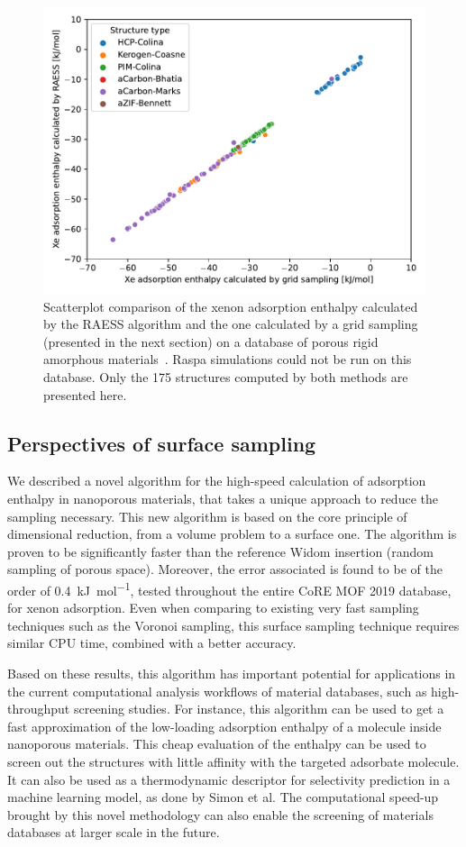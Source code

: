 \documentclass[main]{subfiles}
\begin{document}
\begin{figure}[ht]
  \centering
  \includegraphics[width=0.5\linewidth]{figures/3-fastsim/amorphous_enthalpy.pdf}
  \caption{Scatterplot comparison of the xenon adsorption enthalpy calculated by the RAESS algorithm and the one calculated by a grid sampling (presented in the next section) on a database of porous rigid amorphous materials~\cite{Thyagarajan_2020}. Raspa simulations could not be run on this database. Only the 175 structures computed by both methods are presented here. }\label{fgr:amorphous}
\end{figure}

\subsection{Perspectives of surface sampling}

We described a novel algorithm for the high-speed calculation of adsorption enthalpy in nanoporous materials, that takes a unique approach to reduce the sampling necessary. This new algorithm is based on the core principle of dimensional reduction, from a volume problem to a surface one. The algorithm is proven to be significantly faster than the reference Widom insertion (random sampling of porous space). Moreover, the error associated is found to be of the order of \SI{0.4}{\kilo\joule\per\mole}, tested throughout the entire CoRE MOF 2019 database, for xenon adsorption. Even when comparing to existing very fast sampling techniques such as the Voronoi sampling, this surface sampling technique requires similar CPU time, combined with a better accuracy. 

Based on these results, this algorithm has important potential for applications in the current computational analysis workflows of material databases, such as high-throughput screening studies. For instance, this algorithm can be used to get a fast approximation of the low-loading adsorption enthalpy of a molecule inside nanoporous materials. This cheap evaluation of the enthalpy can be used to screen out the structures with little affinity with the targeted adsorbate molecule. It can also be used as a thermodynamic descriptor for selectivity prediction in a machine learning model, as done by Simon et al.\cite{Simon_2015} The computational speed-up brought by this novel methodology can also enable the screening of materials databases at larger scale in the future.
\end{document}
